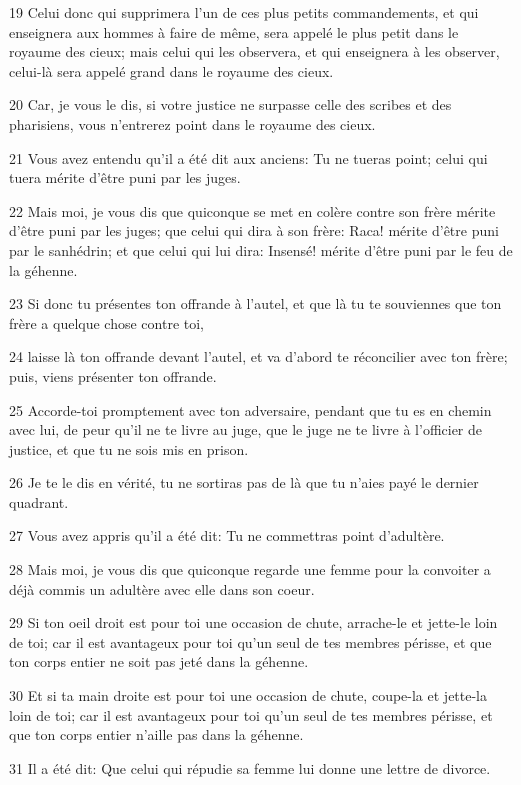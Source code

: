 \par 19 Celui donc qui supprimera l'un de ces plus petits commandements, et qui enseignera aux hommes à faire de même, sera appelé le plus petit dans le royaume des cieux; mais celui qui les observera, et qui enseignera à les observer, celui-là sera appelé grand dans le royaume des cieux.
\par 20 Car, je vous le dis, si votre justice ne surpasse celle des scribes et des pharisiens, vous n'entrerez point dans le royaume des cieux.
\par 21 Vous avez entendu qu'il a été dit aux anciens: Tu ne tueras point; celui qui tuera mérite d'être puni par les juges.
\par 22 Mais moi, je vous dis que quiconque se met en colère contre son frère mérite d'être puni par les juges; que celui qui dira à son frère: Raca! mérite d'être puni par le sanhédrin; et que celui qui lui dira: Insensé! mérite d'être puni par le feu de la géhenne.
\par 23 Si donc tu présentes ton offrande à l'autel, et que là tu te souviennes que ton frère a quelque chose contre toi,
\par 24 laisse là ton offrande devant l'autel, et va d'abord te réconcilier avec ton frère; puis, viens présenter ton offrande.
\par 25 Accorde-toi promptement avec ton adversaire, pendant que tu es en chemin avec lui, de peur qu'il ne te livre au juge, que le juge ne te livre à l'officier de justice, et que tu ne sois mis en prison.
\par 26 Je te le dis en vérité, tu ne sortiras pas de là que tu n'aies payé le dernier quadrant.
\par 27 Vous avez appris qu'il a été dit: Tu ne commettras point d'adultère.
\par 28 Mais moi, je vous dis que quiconque regarde une femme pour la convoiter a déjà commis un adultère avec elle dans son coeur.
\par 29 Si ton oeil droit est pour toi une occasion de chute, arrache-le et jette-le loin de toi; car il est avantageux pour toi qu'un seul de tes membres périsse, et que ton corps entier ne soit pas jeté dans la géhenne.
\par 30 Et si ta main droite est pour toi une occasion de chute, coupe-la et jette-la loin de toi; car il est avantageux pour toi qu'un seul de tes membres périsse, et que ton corps entier n'aille pas dans la géhenne.
\par 31 Il a été dit: Que celui qui répudie sa femme lui donne une lettre de divorce.
